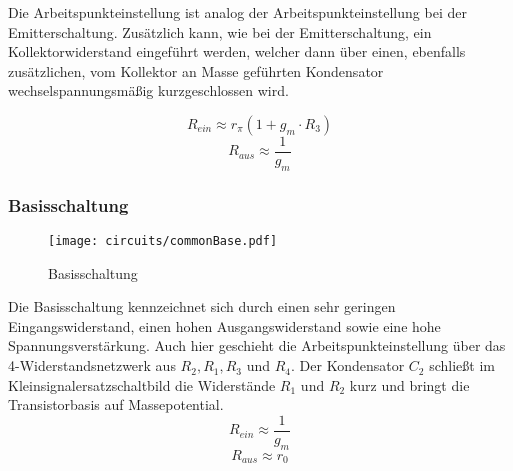 Die Arbeitspunkteinstellung ist analog der Arbeitspunkteinstellung bei der Emitterschaltung.
Zusätzlich kann, wie bei der Emitterschaltung, ein Kollektorwiderstand
eingeführt werden, welcher dann über einen, ebenfalls zusätzlichen, vom
Kollektor an Masse
geführten Kondensator wechselspannungsmäßig kurzgeschlossen wird.

\[R_{ein} \approx r_\pi (1 + g_m \cdot R_3)\]
\[R_{aus} \approx \frac{1}{g_m}\]

\subsubsection{Basisschaltung}
\begin{figure}[H]
  \begin{center}
    \texttt{[image: circuits/commonBase.pdf]}
  \end{center}
  \caption{Basisschaltung}
\end{figure}

Die Basisschaltung kennzeichnet sich durch einen sehr geringen
Eingangswiderstand, einen hohen Ausgangswiderstand sowie eine hohe Spannungsverstärkung.
Auch hier geschieht die Arbeitspunkteinstellung über das 4-Widerstandsnetzwerk
aus $R_2, R_1, R_3$ und $R_4$. Der Kondensator $C_2$ schließt im
Kleinsignalersatzschaltbild die Widerstände $R_1$ und $R_2$ kurz und bringt die Transistorbasis auf Massepotential.
\[R_{ein} \approx \frac{1}{g_m}\]
\[R_{aus} \approx r_0 \]